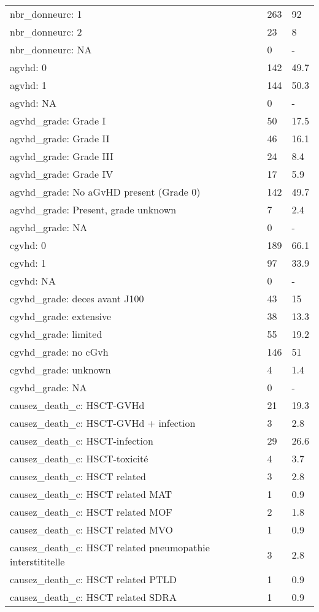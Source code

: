 \documentclass{article}
\begin{document}
\begin{longtable}{lll}
  nbr_donneurc: 1 & 263 & 92 \\ 
  nbr_donneurc: 2 & 23 & 8 \\ 
  nbr_donneurc: NA & 0 & - \\ 
  agvhd: 0 & 142 & 49.7 \\ 
  agvhd: 1 & 144 & 50.3 \\ 
  agvhd: NA & 0 & - \\ 
  agvhd_grade: Grade I & 50 & 17.5 \\ 
  agvhd_grade: Grade II & 46 & 16.1 \\ 
  agvhd_grade: Grade III & 24 & 8.4 \\ 
  agvhd_grade: Grade IV & 17 & 5.9 \\ 
  agvhd_grade: No aGvHD present (Grade 0) & 142 & 49.7 \\ 
  agvhd_grade: Present, grade unknown & 7 & 2.4 \\ 
  agvhd_grade: NA & 0 & - \\ 
  cgvhd: 0 & 189 & 66.1 \\ 
  cgvhd: 1 & 97 & 33.9 \\ 
  cgvhd: NA & 0 & - \\ 
  cgvhd_grade: deces avant J100 & 43 & 15 \\ 
  cgvhd_grade: extensive & 38 & 13.3 \\ 
  cgvhd_grade: limited & 55 & 19.2 \\ 
  cgvhd_grade: no cGvh & 146 & 51 \\ 
  cgvhd_grade: unknown & 4 & 1.4 \\ 
  cgvhd_grade: NA & 0 & - \\ 
  causez_death_c: HSCT-GVHd & 21 & 19.3 \\ 
  causez_death_c: HSCT-GVHd + infection & 3 & 2.8 \\ 
  causez_death_c: HSCT-infection & 29 & 26.6 \\ 
  causez_death_c: HSCT-toxicité & 4 & 3.7 \\ 
  causez_death_c: HSCT related & 3 & 2.8 \\ 
  causez_death_c: HSCT related MAT & 1 & 0.9 \\ 
  causez_death_c: HSCT related MOF & 2 & 1.8 \\ 
  causez_death_c: HSCT related MVO & 1 & 0.9 \\ 
  causez_death_c: HSCT related pneumopathie interstititelle & 3 & 2.8 \\ 
  causez_death_c: HSCT related PTLD & 1 & 0.9 \\ 
  causez_death_c: HSCT related SDRA & 1 & 0.9 \\ 

\end{longtable}
\end{document}
